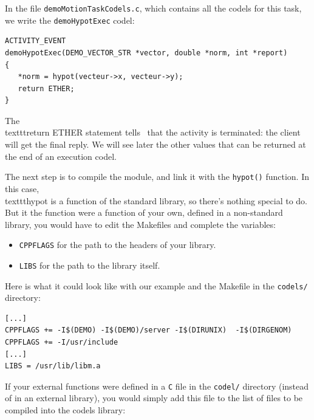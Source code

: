 In the file \texttt{demoMotionTaskCodels.c}, which contains all the codels
for this task, we write the \texttt{demoHypotExec} codel:

\begin{center}\begin{cartouche}\small\begin{verbatim}
ACTIVITY_EVENT
demoHypotExec(DEMO_VECTOR_STR *vector, double *norm, int *report)
{
   *norm = hypot(vecteur->x, vecteur->y);
   return ETHER;
}
\end{verbatim}\end{cartouche}\end{center}

The \\texttt{return  ETHER} statement tells   \GenoM\ that  the  activity is
terminated: the client will  get the final  reply. We will see  later the
other values that can be returned at the end of an execution codel.

The next  step is to  compile the   module,  and link   it with the  
\texttt{hypot()} function.  In  this  case, \\texttt{hypot} is   a function of   the
standard library, so there's nothing special  to do.  But it the function
were a function of your own, defined in a non-standard library, you would
have to edit the Makefiles and complete the variables:

\begin{itemize}
\item \texttt{CPPFLAGS} for the path to the headers of your library.
\item \texttt{LIBS} for the path to the library itself.
\end{itemize}

Here is what it could look like with our example and the Makefile in the
\texttt{codels/} directory:

\begin{center}\begin{cartouche}\small\begin{verbatim}
[...]
CPPFLAGS += -I$(DEMO) -I$(DEMO)/server -I$(DIRUNIX)  -I$(DIRGENOM)
CPPFLAGS += -I/usr/include
[...]
LIBS = /usr/lib/libm.a
\end{verbatim}\end{cartouche}\end{center}

If your external functions  were defined in a  \texttt{C}  file in the  
\texttt{codel/} directory (instead of  in an external  library), you would simply
add this file to the   list  of files to  be   compiled into the   codels
library:

